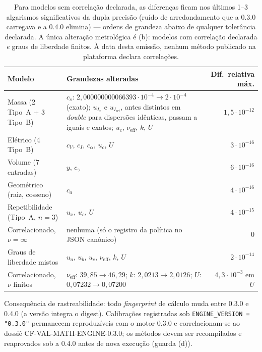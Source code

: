 \documentclass[11pt,a4paper]{article}
\newcommand{\docVersion}{0.4.0}
\newcommand{\previousVersion}{0.3.0}
\begin{document}
\begin{table}[H]
  \centering
  \small
  \begin{tabularx}{\textwidth}{l X r}
    \toprule
    \textbf{Modelo} & \textbf{Grandezas alteradas} & \textbf{Dif.\ relativa máx.} \\
    \midrule
    Massa (2 Tipo~A + 3 Tipo~B) & \(c_s\): \(2{,}000000000066393 \cdot 10^{-4} \to 2 \cdot 10^{-4}\) (exato); \(u_{I_x}\) e \(u_{I_\text{ref}}\), antes distintos em \emph{double} para dispersões idênticas, passam a iguais e exatos; \(u_c\), \(\nu_\text{eff}\), \(k\), \(U\) & \(1{,}5 \cdot 10^{-12}\) \\
    Elétrico (4 Tipo~B)         & \(c_V\), \(c_I\), \(c_\alpha\), \(u_c\), \(U\) & \(3 \cdot 10^{-16}\) \\
    Volume (7 entradas)         & \(y\), \(c_\gamma\) & \(6 \cdot 10^{-16}\) \\
    Geométrico (raiz, cosseno)  & \(c_a\) & \(4 \cdot 10^{-16}\) \\
    Repetibilidade (Tipo~A, \(n=3\)) & \(u_x\), \(u_c\), \(U\) & \(4 \cdot 10^{-15}\) \\
    Correlacionado, \(\nu = \infty\)   & nenhuma (só o registro da política no JSON canônico) & 0 \\
    Graus de liberdade mistos   & \(u_a\), \(u_b\), \(u_c\), \(\nu_\text{eff}\), \(k\), \(U\) & \(2 \cdot 10^{-14}\) \\
    \midrule
    Correlacionado, \(\nu\) finitos & \(\nu_\text{eff}\): \(39{,}85 \to 46{,}29\); \(k\): \(2{,}0213 \to 2{,}0126\); \(U\): \(0{,}07232 \to 0{,}07200\) & \(4{,}3 \cdot 10^{-3}\) em \(U\) \\
    \bottomrule
  \end{tabularx}
  \caption*{\small Para modelos sem correlação declarada, as diferenças ficam nos últimos 1--3 algarismos significativos da dupla precisão (ruído de arredondamento que a \previousVersion{} carregava e a \docVersion{} elimina) --- ordens de grandeza abaixo de qualquer tolerância declarada. A única alteração metrológica é (b): modelos com correlação declarada \emph{e} graus de liberdade finitos. À data desta emissão, nenhum método publicado na plataforma declara correlações.}
\end{table}

Consequência de rastreabilidade: todo \emph{fingerprint} de cálculo muda entre \previousVersion{} e \docVersion{} (a versão integra o digest). Calibrações registradas sob \texttt{ENGINE\_VERSION = "\previousVersion"} permanecem reproduzíveis com o motor \previousVersion{} e correlacionam-se ao dossiê CF-VAL-MATH-ENGINE-0.3.0; os métodos devem ser recompilados e reaprovados sob a \docVersion{} antes de nova execução (guarda (d)).
\end{document}
